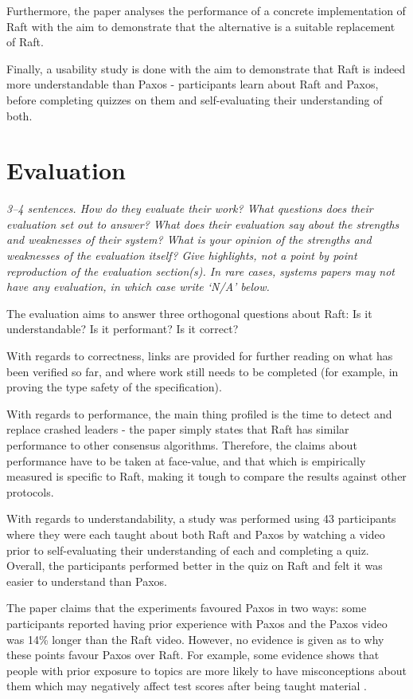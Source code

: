 \documentclass[11pt]{article}
\begin{document}
Furthermore, the paper analyses the performance of a concrete implementation of
Raft \cite{LogCabin} with the aim to demonstrate that the alternative is a
suitable replacement of Raft.

Finally, a usability study is done with the aim to demonstrate that Raft is
indeed more understandable than Paxos - participants learn about Raft and
Paxos, before completing quizzes on them and self-evaluating their
understanding of both.

\section*{Evaluation}

\textsl{3--4 sentences. How do they evaluate their work? What questions does
their evaluation set out to answer? What does their evaluation say about the
strengths and weaknesses of their system? What is your opinion of the strengths
and weaknesses of the evaluation itself? Give highlights, not a point by point
reproduction of the evaluation section(s). In rare cases, systems papers may
not have any evaluation, in which case write `N/A' below.}

The evaluation aims to answer three orthogonal questions about Raft: Is it
understandable? Is it performant? Is it correct?

With regards to correctness, links are provided for further reading on what has
been verified so far, and where work still needs to be completed (for example,
in proving the type safety of the specification).

With regards to performance, the main thing profiled is the time to detect and
replace crashed leaders - the paper simply states that Raft has similar
performance to other consensus algorithms. Therefore, the claims about
performance have to be taken at face-value, and that which is empirically
measured is specific to Raft, making it tough to compare the results against
other protocols.

With regards to understandability, a study was performed using 43 participants
where they were each taught about both Raft and Paxos by watching a video prior
to self-evaluating their understanding of each and completing a quiz. Overall,
the participants performed better in the quiz on Raft and felt it was easier to
understand than Paxos.

The paper claims that the experiments favoured Paxos in two ways: some
participants reported having prior experience with Paxos and the Paxos video
was 14\% longer than the Raft video. However, no evidence is given as to why
these points favour Paxos over Raft. For example, some evidence shows that
people with prior exposure to topics are more likely to have misconceptions
about them which may negatively affect test scores after being taught material
\cite{DerekMuller2008}.
\end{document}
